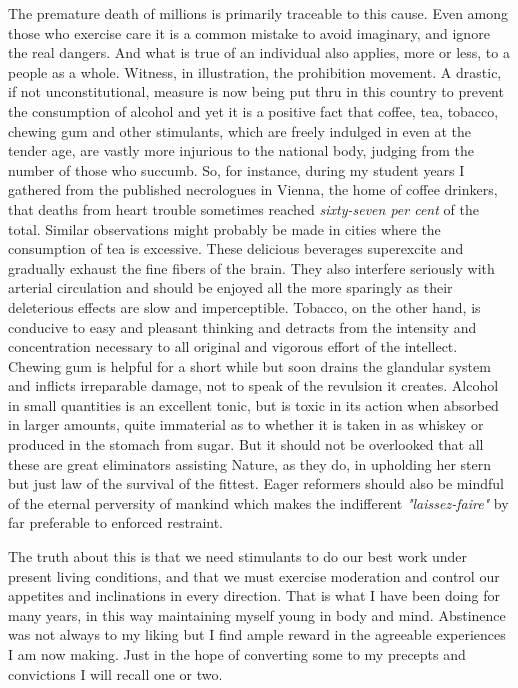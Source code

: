 \documentclass[a4paper,12pt,english,twoside,openright]{memoir}
\begin{document}
	The premature death of millions is primarily traceable to this cause.  Even among those who 
	exercise care it is a common mistake to avoid imaginary, and ignore the real dangers.  And what 
	is true of an individual also applies, more or less, to a people as a whole.  Witness, in illustration, 
	the prohibition movement.  A drastic, if not unconstitutional, measure is now being put thru in this 
	country to prevent the consumption of alcohol and yet it is a positive fact that coffee, tea, tobacco, 
	chewing gum and other stimulants, which are freely indulged in even at the tender age, are vastly 
	more injurious to the national body, judging from the number of those who succumb.  So, for 
	instance, during my student years I gathered from the published necrologues in Vienna, the home 
	of coffee drinkers, that deaths from heart trouble sometimes reached \emph{sixty-seven per cent} of the 
	total.  Similar observations might probably be made in cities where the consumption of tea is 
	excessive.  These delicious beverages superexcite and gradually exhaust the fine fibers of the 
	brain.  They also interfere seriously with arterial circulation and should be enjoyed all the more 
	sparingly as their deleterious effects are slow and imperceptible.  Tobacco, on the other hand, is 
	conducive to easy and pleasant thinking and detracts from the intensity and concentration 
	necessary to all original and vigorous effort of the intellect.  Chewing gum is helpful for a short 
	while but soon drains the glandular system and inflicts irreparable damage, not to speak of the 
	revulsion it creates.  Alcohol in small quantities is an excellent tonic, but is toxic in its action when 
	absorbed in larger amounts, quite immaterial as to whether it is taken in as whiskey or produced 
	in the stomach from sugar.  But it should not be overlooked that all these are great eliminators 
	assisting Nature, as they do, in upholding her stern but just law of the survival of the fittest.  Eager 
	reformers should also be mindful of the eternal perversity of mankind which makes the indifferent 
	\emph{"laissez-faire"} by far preferable to enforced restraint.  


	The truth about this is that we need stimulants to do our best work under present living 
	conditions, and that we must exercise moderation and control our appetites and inclinations in 
	every direction.  That is what I have been doing for many years, in this way maintaining myself 
	young in body and mind.  Abstinence was not always to my liking but I find ample reward in the 
	agreeable experiences I am now making.  Just in the hope of converting some to my precepts 
	and convictions I will recall one or two.  
	
\end{document}

